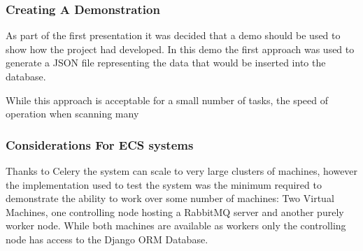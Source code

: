 \subsubsection{Creating A Demonstration}
As part of the first presentation it was decided that a demo should be used to show how the project had developed.  In this demo the first approach was used to generate a JSON file representing the data that would be inserted into the database.

While this approach is acceptable for a small number of tasks, the speed of operation when scanning many 

\subsubsection{Considerations For ECS systems}
Thanks to Celery the system can scale to very large clusters of machines, however the implementation used to test the system was the minimum required to demonstrate the ability to work over some number of machines: Two Virtual Machines, one controlling node hosting a RabbitMQ server and another purely worker node. While both machines are available as workers only the controlling node has access to the Django ORM Database.